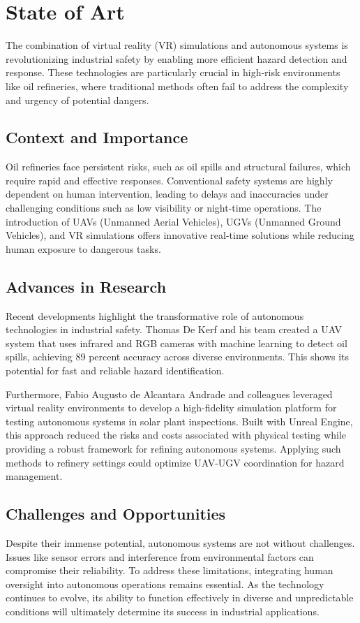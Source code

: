 \section{State of Art}
The combination of virtual reality (VR) simulations and autonomous systems is revolutionizing industrial safety by enabling more efficient hazard detection and response. These technologies are particularly crucial in high-risk environments like oil refineries, where traditional methods often fail to address the complexity and urgency of potential dangers.

\subsection*{Context and Importance}

Oil refineries face persistent risks, such as oil spills and structural failures, which require rapid and effective responses. Conventional safety systems are highly dependent on human intervention, leading to delays and inaccuracies under challenging conditions such as low visibility or night-time operations. The introduction of UAVs (Unmanned Aerial Vehicles), UGVs (Unmanned Ground Vehicles), and VR simulations offers innovative real-time solutions while reducing human exposure to dangerous tasks.

\subsection*{Advances in Research}

Recent developments highlight the transformative role of autonomous technologies in industrial safety. Thomas De Kerf and his team created a UAV system that uses infrared and RGB cameras with machine learning to detect oil spills, achieving 89 percent accuracy across diverse environments. This shows its potential for fast and reliable hazard identification.

Furthermore, Fabio Augusto de Alcantara Andrade and colleagues leveraged virtual reality environments to develop a high-fidelity simulation platform for testing autonomous systems in solar plant inspections. Built with Unreal Engine, this approach reduced the risks and costs associated with physical testing while providing a robust framework for refining autonomous systems. Applying such methods to refinery settings could optimize UAV-UGV coordination for hazard management.

\subsection*{Challenges and Opportunities}

Despite their immense potential, autonomous systems are not without challenges. Issues like sensor errors and interference from environmental factors can compromise their reliability. To address these limitations, integrating human oversight into autonomous operations remains essential. As the technology continues to evolve, its ability to function effectively in diverse and unpredictable conditions will ultimately determine its success in industrial applications.